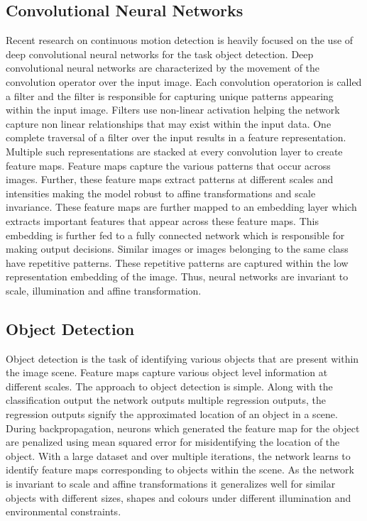 \documentclass[sigconf]{acmart}
\begin{document}
\subsection{Convolutional Neural Networks}

Recent research on continuous motion detection is heavily focused on the use of deep convolutional neural networks for the task object detection. Deep convolutional neural networks \cite{NIPS20124824} are characterized by the movement of the convolution operator over the input image. Each convolution operatorion is called a filter and the filter is responsible for capturing unique patterns appearing within the input image. Filters use non-linear activation helping the network capture non linear relationships that may exist within the input data. One complete traversal of a filter over the input results in a feature representation. Multiple such representations are stacked at every convolution layer to create feature maps. Feature maps capture the various patterns that occur across images. Further, these feature maps extract patterns at different scales and intensities making the model robust to affine transformations and scale invariance. These feature maps are further mapped to an embedding layer which extracts important features that appear across these feature maps. This embedding is further fed to a fully connected network which is responsible for making output decisions. Similar images or images belonging to the same class have repetitive patterns. These repetitive patterns are captured within the low representation embedding of the image. Thus, neural networks are invariant to scale, illumination and affine transformation.

\subsection{Object Detection}

Object detection is the task of identifying various objects that are present within the image scene. Feature maps capture various object level information at different scales. The approach to object detection is simple. Along with the classification output the network outputs multiple regression outputs, the regression outputs signify the approximated location of an object in a scene. During backpropagation, neurons which generated the feature map for the object are penalized using mean squared error for misidentifying the location of the object. With a large dataset and over multiple iterations, the network learns to identify feature maps corresponding to objects within the scene. As the network is invariant to scale and affine transformations it generalizes well for similar objects with different sizes, shapes and colours under different illumination and environmental constraints.
\end{document}
